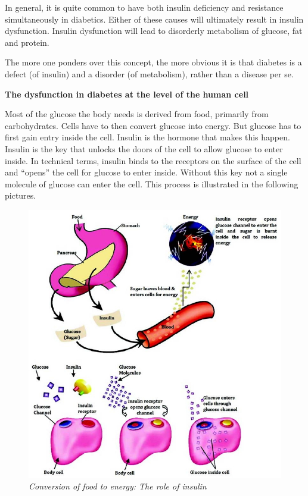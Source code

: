 In general, it is quite common to have both insulin deficiency and resistance simultaneously in diabetics. Either of these causes will ultimately result in insulin dysfunction. Insulin dysfunction will lead to disorderly metabolism of glucose, fat and protein.

The more one ponders over this concept, the more obvious it is that diabetes is a defect (of insulin) and a disorder (of metabolism), rather than a disease per se.

\textbf{The dysfunction in diabetes at the level of the human cell}

Most of the glucose the body needs is derived from food, primarily from carbohydrates. Cells have to then convert glucose into energy. But glucose has to first gain entry inside the cell. Insulin is the hormone that makes this happen. Insulin is the key that unlocks the doors of the cell to allow glucose to enter inside. In technical terms, insulin binds to the receptors on the surface of the cell and “opens” the cell for glucose to enter inside. Without this key not a single molecule of glucose can enter the cell. This process is illustrated in the following pictures.

\begin{figure}
\includegraphics{images/019.jpg}
\caption{\textit{Conversion of food to energy: The role of insulin}}
\end{figure}

